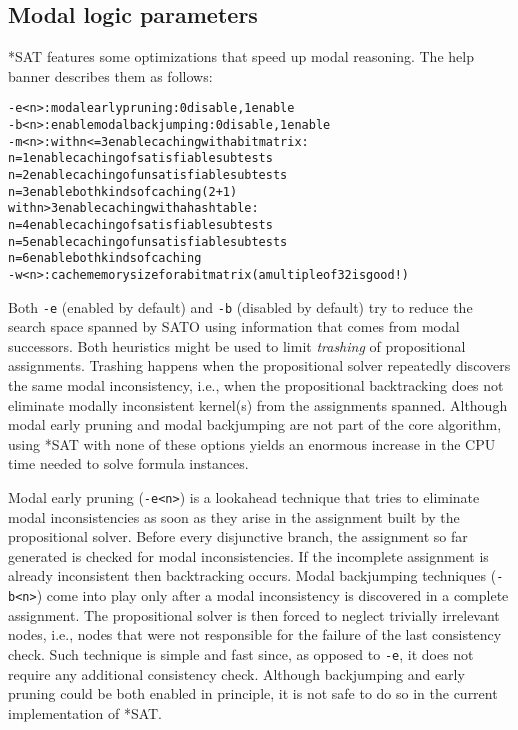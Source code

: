 \documentclass[12pt]{report}
\begin{document}
\subsection{Modal logic parameters}

*SAT features some optimizations that speed up modal reasoning. The
help banner describes them as follows:
\begin{alltt}
\footnotesize
   -e<n>    : modal early pruning: 0 disable, 1 enable   	
   -b<n>    : enable modal backjumping: 0 disable, 1 enable
   -m<n>    : with n<=3 enable caching with a bit matrix:
               n=1 enable caching of satisfiable subtests
               n=2 enable caching of unsatisfiable subtests
               n=3 enable both kinds of caching (2+1)
              with n>3 enable caching with a hash table:
               n=4 enable caching of satisfiable subtests
               n=5 enable caching of unsatisfiable subtests
               n=6 enable both kinds of caching
   -w<n>    : cache memory size for a bit matrix (a multiple of 32 is good!)
\end{alltt}
Both {\tt -e} (enabled by default) and {\tt -b} (disabled by default) 
try to reduce the search space spanned
by SATO using information that comes from modal successors. Both
heuristics might be used to limit \textit{trashing} of propositional
assignments. Trashing happens when the propositional solver repeatedly
discovers the same modal inconsistency, i.e., 
when the propositional backtracking does not eliminate modally inconsistent
kernel(s) from the assignments spanned. 
Although modal early pruning and modal backjumping are not part of the
core algorithm, using *SAT with none of these options yields
an enormous increase in the CPU time needed to solve formula
instances. 

Modal
early pruning ({\tt -e<n>}) is a lookahead technique that tries to
eliminate modal inconsistencies as soon as they arise in the
assignment built by the propositional solver. Before every disjunctive
branch, the assignment so far generated is checked for modal
inconsistencies. If the incomplete assignment is already inconsistent
then backtracking occurs. 
Modal backjumping techniques ({\tt -b<n>}) 
come into play only after a modal inconsistency is discovered in a complete
assignment. 
The propositional solver is then forced to neglect trivially irrelevant nodes,
i.e., nodes that were not responsible for the failure of the last
consistency check. Such technique is simple and fast since, as opposed
to {\tt -e}, it does not require any additional consistency check. 
Although backjumping and early pruning could be both enabled in
principle, it is not safe to do so in the current implementation of *SAT.
\end{document}
